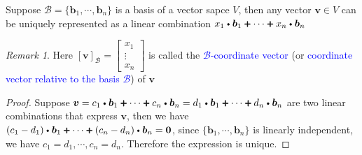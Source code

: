 \documentclass{beamer}
\newcommand{\fatdot}{\mathrel{\raisebox{0.25ex}{\tikz\filldraw[black,x=2pt,y=2pt] (0,0) circle (0.5);}}}
\newcommand{\fatplus}{\mathrel{\raisebox{-0.1ex}{\tikz\filldraw[black,x=2pt,y=2pt,scale=1.4] (0.9,0)--(1.1,0)--(1.1,0.9)--(2,0.9)--(2,1.1)--(1.1,1.1)--(1.1,2)--(0.9,2)--(0.9,1.1)--(0,1.1)--(0,0.9)--(0.9,0.9)--cycle;}}}
\theoremstyle{definition}
\theoremstyle{remark}
\newtheorem*{remark}{Remark}
\begin{document}
\begin{frame}[t]
\begin{theorem}\label{12:53-06/28/2022}
Suppose $\mathcal B=\{\bm b_1,\cdots,\bm b_n\}$ is a basis of a vector sapce $V$, then any vector $\bm v\in V$ can be uniquely represented as a linear combination $x_1\fatdot\bm b_1\fatplus\cdots\fatplus x_n\fatdot\bm b_n$
\end{theorem}
\pause
\begin{remark}
Here $[\bm v]_{\mathcal B}=\begin{bmatrix}
x_1\\\vdots\\x_n
\end{bmatrix}$ is called the \textcolor{blue}{$\mathcal B$-coordinate vector} (or \textcolor{blue}{coordinate vector relative to the basis $\mathcal B$}) of $\bm v$
\end{remark}
\pause
\begin{proof}
Suppose $\bm v=c_1\fatdot\bm b_1\fatplus\cdots\fatplus c_n\fatdot\bm b_n=d_1\fatdot\bm b_1\fatplus\cdots\fatplus d_n\fatdot\bm b_n$ are two linear combinations that express $\bm v$, then we have $(c_1-d_1)\fatdot\bm b_1\fatplus\cdots\fatplus(c_n-d_n)\fatdot\bm b_n=\bm0$, since $\{\bm b_1,\cdots,\bm b_n\}$ is linearly independent, we have $c_1=d_1,\cdots,c_n=d_n$. Therefore the expression is unique.
\end{proof}
\end{frame}
\end{document}
